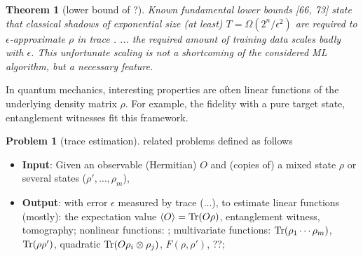 \documentclass[
reprint,
aps,
pra,
floatfix,
]{revtex4-2}
\theoremstyle{plain}
\newtheorem{theorem}{Theorem}
\theoremstyle{definition}
\newtheorem{problem}{Problem}
\newcommand{\ob}{O}
\newcommand{\dm}{\rho}
\begin{document}
\begin{theorem}[lower bound of ?\cite{haahSampleoptimalTomographyQuantum2017}]
	Known fundamental lower bounds [66, 73] state that classical shadows of exponential size (at least) $T = \Omega( 2^n / \epsilon^2)$ are required to $\epsilon$-approximate $\dm$ in trace .
	\cite{huangProvablyEfficientMachine2021}
	... the required amount of training data scales badly with $\epsilon$. This unfortunate scaling is not a shortcoming of the considered ML algorithm, but a necessary feature.
\end{theorem}
In quantum mechanics, interesting properties are often linear functions of the underlying density matrix $\dm$.
For example, the fidelity with a pure target state, entanglement witnesses fit this framework.
\begin{problem}[trace estimation]\label{prm:trace_estimation}
	related problems defined as follows
	\begin{itemize}
		\item \textbf{Input}: Given an observable (Hermitian) $\ob$ and (copies of) a mixed state $\dm$ or several states ($\dm',\dots,\dm_m$), 
		\item \textbf{Output}: 
		with error $\epsilon$ measured by trace  (...), to estimate
		linear functions (mostly): the expectation value $\expval{\ob}=\Tr(\ob \dm) $, entanglement witness, tomography; 
		nonlinear functions: ;
		multivariate functions:  $\Tr(\dm_1 \cdots \dm_m)$,  $\Tr(\dm\dm')$,  quadratic $\Tr(\ob \dm_i \otimes \dm_j)$,  $F(\dm,\dm')$, ??;
	\end{itemize}
\end{problem}
\end{document}
